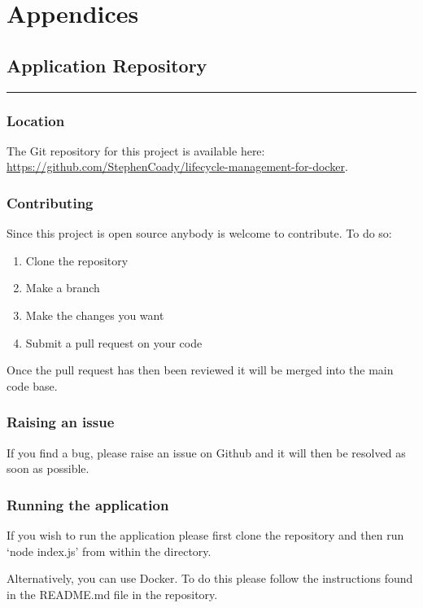 \appendix
\section*{Appendices}
\renewcommand{\thesubsection}{\Alph{subsection}}

\subsection{Application Repository}
\label{appendix:code}
\rule{\textwidth}{0.4pt}

\subsubsection{Location}
The Git repository for this project is available here: \newline \url{https://github.com/StephenCoady/lifecycle-management-for-docker}.

\subsubsection{Contributing}
Since this project is open source anybody is welcome to contribute. To do so:
\begin{enumerate}
	\item Clone the repository
	\item Make a branch
	\item Make the changes you want
	\item Submit a pull request on your code
\end{enumerate}
Once the pull request has then been reviewed it will be merged into the main code base.
\subsubsection{Raising an issue}
If you find a bug, please raise an issue on Github and it will then be resolved as soon as possible. 

\subsubsection{Running the application}
If you wish to run the application please first clone the repository and then run `node index.js' from within the directory.

Alternatively, you can use Docker. To do this please follow the instructions found in the README.md file in the repository.
\clearpage

